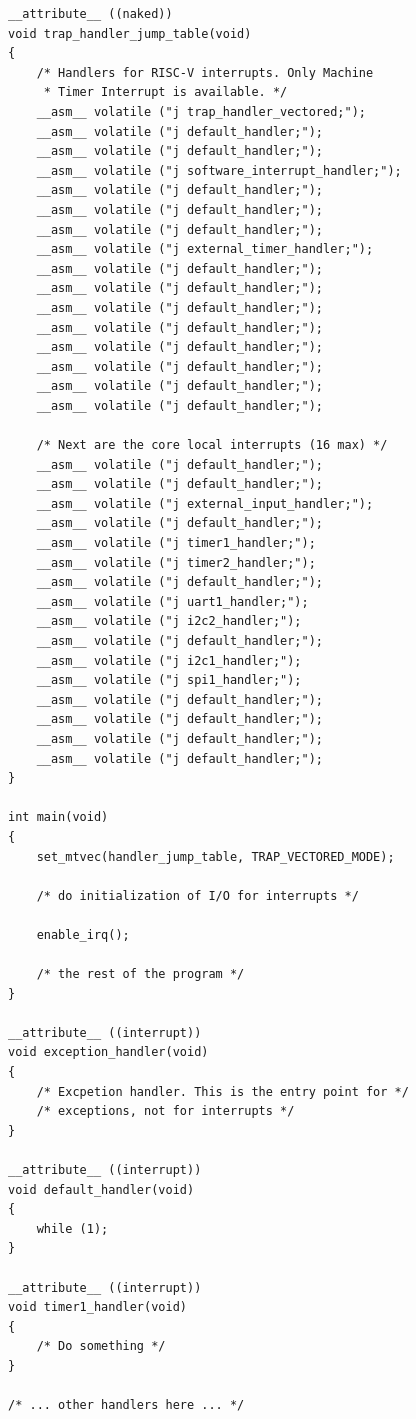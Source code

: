 \documentclass[12pt]{article}
\begin{document}
\begin{lstlisting}[]
__attribute__ ((naked))
void trap_handler_jump_table(void)
{
    /* Handlers for RISC-V interrupts. Only Machine
     * Timer Interrupt is available. */
    __asm__ volatile ("j trap_handler_vectored;");
    __asm__ volatile ("j default_handler;");
    __asm__ volatile ("j default_handler;");
    __asm__ volatile ("j software_interrupt_handler;");
    __asm__ volatile ("j default_handler;");
    __asm__ volatile ("j default_handler;");
    __asm__ volatile ("j default_handler;");
    __asm__ volatile ("j external_timer_handler;");
    __asm__ volatile ("j default_handler;");
    __asm__ volatile ("j default_handler;");
    __asm__ volatile ("j default_handler;");
    __asm__ volatile ("j default_handler;");
    __asm__ volatile ("j default_handler;");
    __asm__ volatile ("j default_handler;");
    __asm__ volatile ("j default_handler;");
    __asm__ volatile ("j default_handler;");

    /* Next are the core local interrupts (16 max) */
    __asm__ volatile ("j default_handler;");
    __asm__ volatile ("j default_handler;");
    __asm__ volatile ("j external_input_handler;");
    __asm__ volatile ("j default_handler;");
    __asm__ volatile ("j timer1_handler;");
    __asm__ volatile ("j timer2_handler;");
    __asm__ volatile ("j default_handler;");
    __asm__ volatile ("j uart1_handler;");
    __asm__ volatile ("j i2c2_handler;");
    __asm__ volatile ("j default_handler;");
    __asm__ volatile ("j i2c1_handler;");
    __asm__ volatile ("j spi1_handler;");
    __asm__ volatile ("j default_handler;");
    __asm__ volatile ("j default_handler;");
    __asm__ volatile ("j default_handler;");
    __asm__ volatile ("j default_handler;");
}

int main(void)
{
    set_mtvec(handler_jump_table, TRAP_VECTORED_MODE);

    /* do initialization of I/O for interrupts */

    enable_irq();

    /* the rest of the program */
}

__attribute__ ((interrupt))
void exception_handler(void)
{
    /* Excpetion handler. This is the entry point for */
    /* exceptions, not for interrupts */
}

__attribute__ ((interrupt))
void default_handler(void)
{
    while (1);
}

__attribute__ ((interrupt))
void timer1_handler(void)
{
    /* Do something */
}

/* ... other handlers here ... */
\end{lstlisting}
\end{document}
